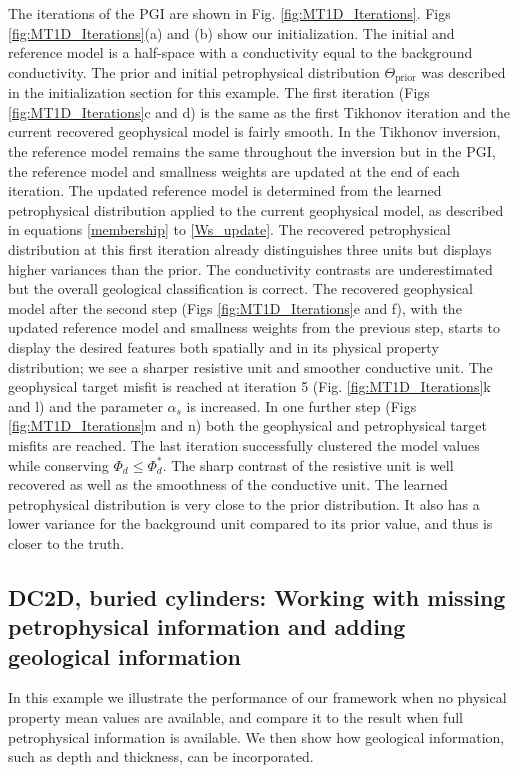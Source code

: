 \documentclass[extra]{gji} %
\begin{document}
The iterations of the PGI are shown in Fig. \ref{fig:MT1D_Iterations}. Figs \ref{fig:MT1D_Iterations}(a) and (b) show our initialization. The initial and reference model is a half-space with a conductivity equal to the background conductivity. The prior and initial petrophysical distribution $\Theta_{\text{prior}}$ was described in the initialization section for this example. The first iteration (Figs \ref{fig:MT1D_Iterations}c and d) is the same as the first Tikhonov iteration and the current recovered geophysical model is fairly smooth. In the Tikhonov inversion, the reference model remains the same throughout the inversion but in the PGI, the reference model and smallness weights are updated at the end of each iteration. The updated reference model is determined from the learned petrophysical distribution applied to the current geophysical model, as described in equations \ref{membership} to \ref{Ws_update}. The recovered petrophysical distribution at this first iteration already distinguishes three units but displays higher variances than the prior. The conductivity contrasts are underestimated but the overall geological classification is correct. The recovered geophysical model after the second step (Figs \ref{fig:MT1D_Iterations}e and f), with the updated reference model and smallness weights from the previous step, starts to display the desired features both spatially and in its physical property distribution; we see a sharper resistive unit and smoother conductive unit. The geophysical target misfit is reached at iteration 5 (Fig. \ref{fig:MT1D_Iterations}k and l) and the parameter $\alpha_s$ is increased. In one further step (Figs \ref{fig:MT1D_Iterations}m and n) both the geophysical and petrophysical target misfits are reached. The last iteration successfully clustered the model values while conserving $\Phi_d\leq\Phi_d^*$. The sharp contrast of the resistive unit is well recovered as well as the smoothness of the conductive unit. The learned petrophysical distribution is very close to the prior distribution. It also has a lower variance for the background unit compared to its prior value, and thus is closer to the truth.


\subsection{DC2D, buried cylinders: Working with missing petrophysical information and adding geological information} \label{DCexample}

In this example we illustrate the performance of our framework when no physical property mean values are available, and compare it to the result when full petrophysical information is available. We then show how geological information, such as depth and thickness, can be incorporated.
\end{document}
